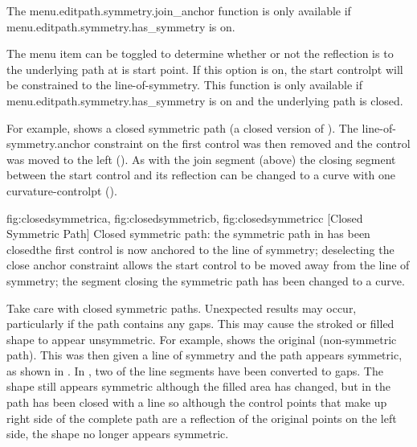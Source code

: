 The \gls{menu.editpath.symmetry.join_anchor} function is only available
if \gls{menu.editpath.symmetry.has_symmetry} is on.


The  menu item can be toggled
to determine whether or not the reflection is
 to the
underlying path at is start point.  If this option is on, the start
\gls{controlpt} will be constrained to the \gls{line-of-symmetry}.  This
function is only available if
\gls{menu.editpath.symmetry.has_symmetry} is on and the
underlying \gls{path} is closed.

For example,  shows a closed
symmetric path (a closed version of ). The
\gls{line-of-symmetry.anchor} constraint on the first control was
then removed and the control was moved to the left
(). As with the join segment (above)
the closing segment between the start control and its reflection can
be changed to a curve with one \gls{curvature-controlpt}
().

{
 {fig:closedsymmetrica}{}{},
 {fig:closedsymmetricb}{}{},
 {fig:closedsymmetricc}{}{}
}
[Closed Symmetric Path]
{Closed symmetric path:  the symmetric path in
 has been closed\dash the
first control is now anchored to the line of symmetry;
 deselecting the close anchor constraint allows
the start control to be moved away from the line of symmetry;
 the segment closing the symmetric path has been
changed to a curve.}

\begin{warning}
Take care with closed symmetric paths. Unexpected results
may occur, particularly if the path contains any gaps. This may
cause the stroked or filled shape to appear unsymmetric.
For example,  shows the original
(non-symmetric path). This was then given a line of symmetry and
the path appears symmetric, as shown in . In
, two of the line segments have been
converted to gaps. The shape still appears symmetric although the
filled area has changed, but in  the path
has been closed with a line so although the control points that
make up right side of the complete path are a reflection of the
original points on the left side, the shape no longer appears
symmetric.
\end{warning}

